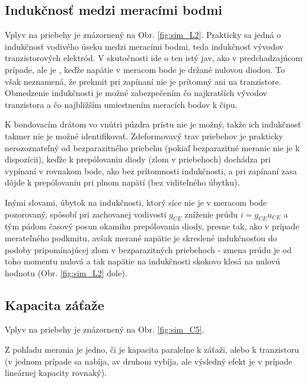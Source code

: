 \subsection{Indukčnosť medzi meracími bodmi}
Vplyv na priebehy je znázornený na Obr. \ref{fig:sim_L2}.
Prakticky sa jedná o indukčnosť vodivého úseku medzi meracími bodmi, teda indukčnosť vývodov tranzistorových elektród. V skutočnosti ide o ten istý jav, ako v predchadzajúcom prípade, ale je , keďže napätie v meracom bode je držané nulovou diodou. To však neznamená, že prekmit pri zapínaní nie je prítomný ani na tranzistore.
Obmedzenie indukčnosti je možné zabezpečením čo najkratších vývodov tranzistora a čo najbližším umiestnením meracích bodov k čipu. 

K bondovacím drátom vo vnútri púzdra prístu nie je možný, takže ich indukčnosť takmer nie  je možné identifikovať. Zdeformovavý trav priebehov je  prakticky nerozoznateľný od bezparazitného priebehu (pokiaľ bezparazitné meranie nie je k dispozícii), keďže k prepólovaniu diody (zlom v priebehoch) dochádza pri vypínaní v rovnakom bode, ako bez prítomnosti indukčnosti, a pri zapínaní zasa dôjde k prepólovaniu  pri plnom napätí (bez viditeľného úbytku).

Inými slovami, úbytok na indukčnosti, ktorý síce nie je v meracom bode pozorovaný, spôsobí pri zachovanej vodivosti $g_{CE}$ zníženie prúdu $i=g_{CE} u_{CE}$ a tým pádom časový posun okamihu prepólovania diody, presne tak, ako v prípade merateľného podkmitu, avšak merané napätie je skreslené indukčnosťou do podoby pripomínajúcej zlom v bezparazitných priebehoch - zmena prúdu je od toho momentu nulová a tak napätie na indukčnosti skokovo klesá na nulovú hodnotu (Obr. \ref{fig:sim_L2} dole).


\subsection{Kapacita záťaže}
Vplyv na priebehy je znázornený na Obr. \ref{fig:sim_C5}.

Z pohľadu merania je jedno, či je kapacita  paralelne k záťaži, alebo k tranzistoru (v jednom prípade sa nabíja, av druhom vybíja, ale výsledný efekt je v prípade lineárnej kapacity rovnaký). 

